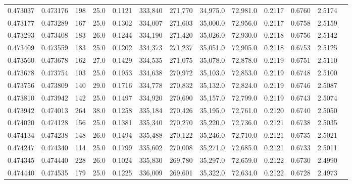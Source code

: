 \begin{tabular}{rrrrrrrrrrrrr}
0.473037 & 0.473176 &   198 & 25.0 &                                     0.1121 & 333,840 & 271,770 &  34,975.0 &  72,981.0 & 0.2117 & 0.6760 & 2.5174 \\
0.473177 & 0.473289 &   167 & 25.0 &                                     0.1302 & 334,007 & 271,603 &  35,000.0 &  72,956.0 & 0.2117 & 0.6758 & 2.5159 \\
0.473293 & 0.473408 &   183 & 26.0 &                                     0.1244 & 334,190 & 271,420 &  35,026.0 &  72,930.0 & 0.2118 & 0.6756 & 2.5142 \\
0.473409 & 0.473559 &   183 & 25.0 &                                     0.1202 & 334,373 & 271,237 &  35,051.0 &  72,905.0 & 0.2118 & 0.6753 & 2.5125 \\
0.473560 & 0.473678 &   162 & 27.0 &                                     0.1429 & 334,535 & 271,075 &  35,078.0 &  72,878.0 & 0.2119 & 0.6751 & 2.5110 \\
0.473678 & 0.473754 &   103 & 25.0 &                                     0.1953 & 334,638 & 270,972 &  35,103.0 &  72,853.0 & 0.2119 & 0.6748 & 2.5100 \\
0.473756 & 0.473809 &   140 & 29.0 &                                     0.1716 & 334,778 & 270,832 &  35,132.0 &  72,824.0 & 0.2119 & 0.6746 & 2.5087 \\
0.473810 & 0.473942 &   142 & 25.0 &                                     0.1497 & 334,920 & 270,690 &  35,157.0 &  72,799.0 & 0.2119 & 0.6743 & 2.5074 \\
0.473942 & 0.474013 &   264 & 38.0 &                                     0.1258 & 335,184 & 270,426 &  35,195.0 &  72,761.0 & 0.2120 & 0.6740 & 2.5050 \\
0.474020 & 0.474128 &   156 & 25.0 &                                     0.1381 & 335,340 & 270,270 &  35,220.0 &  72,736.0 & 0.2121 & 0.6738 & 2.5035 \\
0.474134 & 0.474238 &   148 & 26.0 &                                     0.1494 & 335,488 & 270,122 &  35,246.0 &  72,710.0 & 0.2121 & 0.6735 & 2.5021 \\
0.474247 & 0.474340 &   114 & 25.0 &                                     0.1799 & 335,602 & 270,008 &  35,271.0 &  72,685.0 & 0.2121 & 0.6733 & 2.5011 \\
0.474345 & 0.474440 &   228 & 26.0 &                                     0.1024 & 335,830 & 269,780 &  35,297.0 &  72,659.0 & 0.2122 & 0.6730 & 2.4990 \\
0.474440 & 0.474535 &   179 & 25.0 &                                     0.1225 & 336,009 & 269,601 &  35,322.0 &  72,634.0 & 0.2122 & 0.6728 & 2.4973 \\

\end{tabular}
